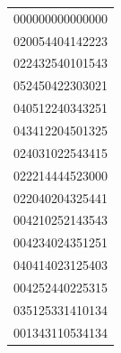 \begin{tabular}{c}
000000000000000\\
020054404142223\\
022432540101543\\
052450422303021\\
040512240343251\\
043412204501325\\
024031022543415\\
022214444523000\\
022040204325441\\
004210252143543\\
004234024351251\\
040414023125403\\
004252440225315\\
035125331410134\\
001343110534134
\end{tabular}
